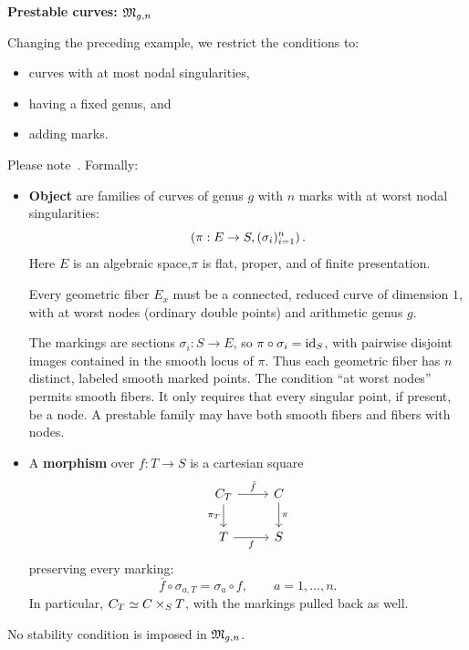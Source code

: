 \documentclass[12pt]{memoir}
\begin{document}
\begin{ptcb}
    \textbf{Prestable curves: \(\mathfrak{M}_{g,n}\)}\par
    Changing the preceding example, we restrict the conditions to:
    \begin{itemize}
        \item curves with at most nodal singularities,
        \item having a fixed genus, and
        \item adding marks.
    \end{itemize}
    Please note~\cite{notes:stacks-prestable,notes:fantechi-gw}. Formally:
    \begin{itemize}
        \item \textbf{Object} are families of curves of genus \(g\) with \(n\) marks with at worst nodal singularities:
        \[
            \left(\pi:E\to S,(\sigma_i)_{i=1}^n\right).
        \]
        Here \(E\) is an algebraic space,\(\pi\) is flat, proper, and of finite presentation.\par
        Every geometric fiber \(E_{x}\) must be a connected, reduced curve of dimension \(1\), with at worst nodes (ordinary double points) and arithmetic genus \(g\).\par
        The markings are sections \(\sigma_i:S\to E\), so \(\pi\circ\sigma_i=\operatorname{id}_S\), with pairwise disjoint images contained in the smooth locus of \(\pi\). Thus each geometric fiber has \(n\) distinct, labeled smooth marked points. The condition ``at worst nodes'' permits smooth fibers. It only requires that every singular point, if present, be a node. A prestable family may have both smooth fibers and fibers with nodes.
        \item A \textbf{morphism} over \(f:T\to S\) is a cartesian square
        \[
            \begin{tikzcd}
                C_T \arrow[r, "\bar f"] \arrow[d, "\pi_T"']
                    & C \arrow[d, "\pi"] \\
                T \arrow[r, "f"'] & S
            \end{tikzcd}
        \]
        preserving every marking:
        \[
            \bar f\circ\sigma_{a,T}=\sigma_a\circ f,
            \qquad a=1,\ldots,n.
        \]
        In particular, \(C_T\simeq C\times_S T\), with the markings pulled back as well.
    \end{itemize}
    No stability condition is imposed in \(\mathfrak{M}_{g,n}\).
\end{ptcb}
\end{document}
